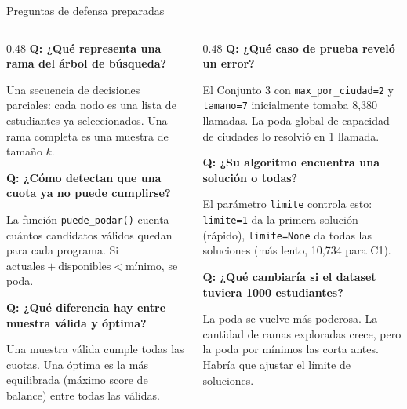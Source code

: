 \documentclass[aspectratio=169, 10pt]{beamer}
\begin{document}
\begin{frame}{Preguntas de defensa preparadas}
  \begin{columns}[T]
    \begin{column}{0.48\textwidth}
      \textbf{Q: ¿Qué representa una rama del árbol de búsqueda?}

      \small Una secuencia de decisiones parciales: cada nodo es una lista de estudiantes ya seleccionados. Una rama completa es una muestra de tamaño $k$.

      \vspace{0.35cm}
      \textbf{Q: ¿Cómo detectan que una cuota ya no puede cumplirse?}

      \small La función \texttt{puede\_podar()} cuenta cuántos candidatos válidos quedan para cada programa. Si $\text{actuales} + \text{disponibles} < \text{mínimo}$, se poda.

      \vspace{0.35cm}
      \textbf{Q: ¿Qué diferencia hay entre muestra válida y óptima?}

      \small Una muestra válida cumple todas las cuotas. Una óptima es la más equilibrada (máximo score de balance) entre todas las válidas.
    \end{column}
    \begin{column}{0.48\textwidth}
      \textbf{Q: ¿Qué caso de prueba reveló un error?}

      \small El Conjunto 3 con \texttt{max\_por\_ciudad=2} y \texttt{tamano=7} inicialmente tomaba 8,380 llamadas. La poda global de capacidad de ciudades lo resolvió en 1 llamada.

      \vspace{0.35cm}
      \textbf{Q: ¿Su algoritmo encuentra una solución o todas?}

      \small El parámetro \texttt{limite} controla esto: \texttt{limite=1} da la primera solución (rápido), \texttt{limite=None} da todas las soluciones (más lento, 10,734 para C1).

      \vspace{0.35cm}
      \textbf{Q: ¿Qué cambiaría si el dataset tuviera 1000 estudiantes?}

      \small La poda se vuelve más poderosa. La cantidad de ramas exploradas crece, pero la poda por mínimos las corta antes. Habría que ajustar el límite de soluciones.
    \end{column}
  \end{columns}
\end{frame}
\end{document}
